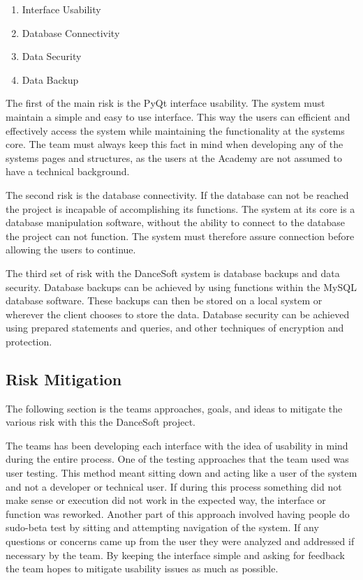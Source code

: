 \begin{enumerate}
\item Interface Usability
\item Database Connectivity
\item Data Security
\item Data Backup
\end{enumerate}

The first of the main risk is the PyQt interface usability. The system must maintain a simple and easy to use interface. This way the users can efficient and effectively access the system while maintaining the functionality at the systems core. The team must always keep this fact in mind when developing any of the systems pages and structures, as the users at the Academy are not assumed to have a technical background.

The second risk is the database connectivity. If the database can not be reached the project is incapable of accomplishing its functions. The system at its core is a database manipulation software, without the ability to connect to the database the project can not function. The system must therefore assure connection before allowing the users to continue.

The third set of risk with the DanceSoft system is database backups and data security. Database backups can be achieved by using functions within the MySQL database software. These backups can then be stored on a local system or wherever the client chooses to store the data. Database security can be achieved using prepared statements and queries, and other techniques of encryption and protection.  


\subsection{Risk Mitigation}
The following section is the teams approaches, goals, and ideas to mitigate the various risk with this the DanceSoft project.

The teams has been developing each interface with the idea of usability in mind during the entire process. One of the testing approaches that the team used was user testing. This method meant sitting down and acting like a user of the system and not a developer or technical user. If during this process something did not make sense or execution did not work in the expected way, the interface or function was reworked. Another part of this approach involved having people do sudo-beta test by sitting and attempting navigation of the system. If any questions or concerns came up from the user they were analyzed and addressed if necessary by the team. By keeping the interface simple and asking for feedback the team hopes to mitigate usability issues as much as possible.

